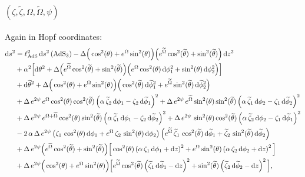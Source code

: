 \documentclass[a4paper, 11pt]{article}
\numberwithin{equation}{section}
\newcommand{\ts}[1]{\widetilde{#1}}
\newcommand{\+}{\oplus}
\renewcommand{\d}{\ensuremath{\mathrm{d}}\xspace}
\begin{document}
\paragraph{\boldmath $(\zeta,\ts{\zeta},\Omega,\ts{\Omega},\psi)$}
Again in Hopf coordinates:
\begin{equation} \label{eq:metriczeta}
	\begin{split}
		\d s^{2} &= \ell_{\rm AdS}^{2}\,\d s^{2}\left({\rm AdS}_{3}\right) -\Delta\Big(\cos^{2}(\theta)+e^{\Omega}\sin^{2}(\theta)\Big)\Big(e^{\ts{\Omega}}\cos^{2}(\ts{\theta})+\sin^{2}(\ts{\theta})\Big)\,\d z^{2}\\
		&+ \alpha^{2}\Big[\d\theta^{2} + \Delta\Big(e^{\ts{\Omega}}\cos^{2}(\ts{\theta})+\sin^{2}(\ts{\theta})\Big)\Big(e^{\Omega}\cos^{2}(\theta)\,\d\phi_{1}^{2}+\sin^{2}(\theta)\,\d\phi_{2}^{2}\Big)\Big]\\
		&+\d\ts{\theta}^{2} + \Delta\Big(\cos^{2}(\theta)+e^{\Omega}\sin^{2}(\theta)\Big)\Big(\cos^{2}(\ts{\theta})\,\d\ts{\phi}_{1}^{2}+e^{\ts{\Omega}}\sin^{2}(\ts{\theta})\,\d\ts{\phi}_{2}^{2}\Big)\\
		&+\Delta\,e^{2\psi}\,e^{\Omega}\cos^{2}(\theta)\cos^{2}(\ts{\theta}) \left(\alpha\,\ts{\zeta}_{2}\,\d\phi_{1}-\zeta_{2}\,\d\ts{\phi}_{1}\right)^{2}+\Delta\,e^{2\psi}\,e^{\ts{\Omega}}\sin^{2}(\theta)\sin^{2}(\ts{\theta}) \left(\alpha\,\ts{\zeta}_{1}\,\d\phi_{2}-\zeta_{1}\,\d\ts{\phi}_{2}\right)^{2}\\
		&+\Delta\,e^{2\psi}\,e^{\Omega+\ts{\Omega}}\cos^{2}(\theta)\sin^{2}(\ts{\theta}) \left(\alpha\,\ts{\zeta}_{1}\,\d\phi_{1}-\zeta_{2}\,\d\ts{\phi}_{2}\right)^{2}+\Delta\,e^{2\psi}\,\sin^{2}(\theta)\cos^{2}(\ts{\theta}) \left(\alpha\,\ts{\zeta}_{2}\,\d\phi_{2}-\zeta_{1}\,\d\ts{\phi}_{1}\right)^{2}\\
		&-2\,\alpha\,\Delta\,e^{2\psi}\left(\zeta_{1}\,\cos^{2}(\theta)\,\d\phi_{1}+e^{\Omega}\,\zeta_{2}\,\sin^{2}(\theta)\,\d\phi_{2}\right)\left(e^{\ts{\Omega}}\,\ts{\zeta}_{1}\,\cos^{2}(\ts{\theta})\,\d\ts{\phi}_{1}+\ts{\zeta}_{2}\,\sin^{2}(\ts{\theta})\,\d\ts{\phi}_{2}\right)\\
		&+\Delta\,e^{2\psi}\Big(e^{\ts{\Omega}}\cos^{2}(\ts{\theta})+\sin^{2}(\ts{\theta})\Big)\Big[\cos^{2}(\theta)\left(\alpha\,\zeta_{1}\,\d\phi_{1}+\d z\right)^{2}+e^{\Omega}\sin^{2}(\theta)\left(\alpha\,\zeta_{2}\,\d\phi_{2}+\d z\right)^{2}\Big]\\
		&+\Delta\,e^{2\psi}\Big(\cos^{2}(\theta)+e^{\Omega}\sin^{2}(\theta)\Big)\Big[e^{\ts{\Omega}}\cos^{2}(\ts{\theta})\left(\ts{\zeta}_{1}\,\d\ts{\phi}_{1}-\d z\right)^{2}+\sin^{2}(\ts{\theta})\left(\ts{\zeta}_{2}\,\d\ts{\phi}_{2}-\d z\right)^{2}\Big],
	\end{split}
\end{equation}
\end{document}

